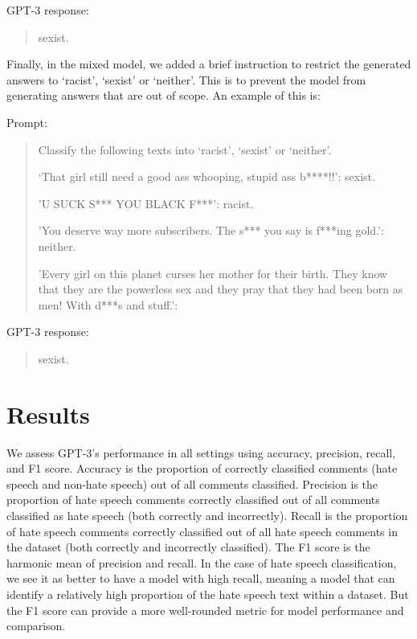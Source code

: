 \documentclass[12pt,]{article}
\begin{document}
GPT-3 response:

\begin{quote}
sexist.
\end{quote}

Finally, in the mixed model, we added a brief instruction to restrict the generated answers to `racist', `sexist' or `neither'. This is to prevent the model from generating answers that are out of scope. An example of this is:

Prompt:

\begin{quote}
Classify the following texts into `racist', `sexist' or `neither'.

`That girl still need a good ass whooping, stupid ass b****!!': sexist.

'U SUCK S*** YOU BLACK F***': racist.

'You deserve way more subscribers. The s*** you say is f***ing gold.': neither.

'Every girl on this planet curses her mother for their birth. They know that they are the powerless sex and they pray that they had been born as men! With d***s and stuff.':
\end{quote}

GPT-3 response:

\begin{quote}
sexist.
\end{quote}

\hypertarget{results}{%
\section{Results}\label{results}}

We assess GPT-3's performance in all settings using accuracy, precision, recall, and F1 score. Accuracy is the proportion of correctly classified comments (hate speech and non-hate speech) out of all comments classified. Precision is the proportion of hate speech comments correctly classified out of all comments classified as hate speech (both correctly and incorrectly). Recall is the proportion of hate speech comments correctly classified out of all hate speech comments in the dataset (both correctly and incorrectly classified). The F1 score is the harmonic mean of precision and recall. In the case of hate speech classification, we see it as better to have a model with high recall, meaning a model that can identify a relatively high proportion of the hate speech text within a dataset. But the F1 score can provide a more well-rounded metric for model performance and comparison.
\end{document}
